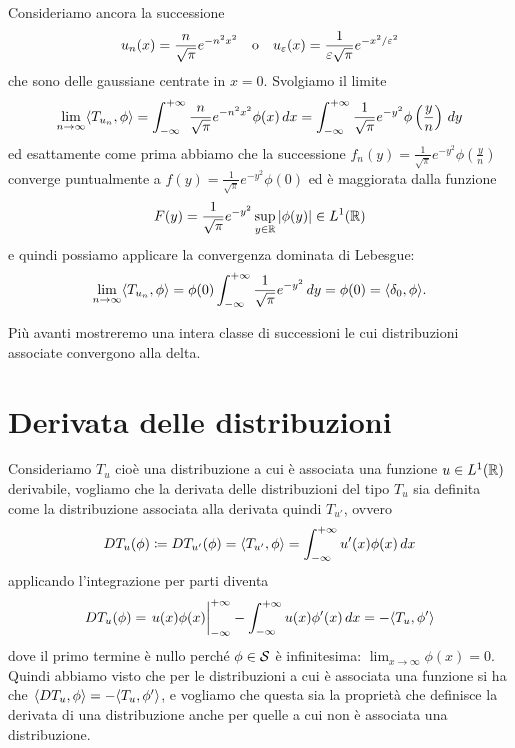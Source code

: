 \begin{example}
  Consideriamo ancora la successione 
  \begin{align}
    u_n(x) = \frac{n}{\sqrt{\pi}} e^{-n^2x^2} \quad \textnormal{o} \quad u_\varepsilon(x) = \frac1{\varepsilon\sqrt{\pi}} e^{-x^2/\varepsilon^2}
  \end{align}
  che sono delle gaussiane centrate in $ x = 0 $. Svolgiamo il limite 
  \begin{align}
    \lim_{n \to \infty} \sc{T_{u_n}, \phi} = \int_{-\infty}^{+\infty} \frac{n}{\sqrt{\pi}} e^{-n^2x^2} \phi(x) \,dx 
    = \int_{-\infty}^{+\infty} \frac1{\sqrt{\pi}} e^{-y^2} \phi\left( \frac{y}{n} \right)\,dy
  \end{align}
  ed esattamente come prima abbiamo che la successione $ f_n(y) = \frac1{\sqrt{\pi}} e^{-y^2} \phi\left( \frac{y}{n} \right) $ converge puntualmente a 
  $ f(y) = \frac1{\sqrt{\pi}} e^{-y^2} \phi(0) $ ed è maggiorata dalla funzione
  \begin{align}
    F(y) = \frac1{\sqrt{\pi}} e^{-y^2} \sup_{y \in \R}\abs{\phi(y)} \in L^1(\R)
  \end{align}
  e quindi possiamo applicare la convergenza dominata di Lebesgue:
  \begin{align}
    \lim_{n \to \infty} \sc{T_{u_n}, \phi} = \phi(0) \int_{-\infty}^{+\infty} \frac1{\sqrt{\pi}} e^{-y^2} \,dy = \phi(0) = \sc{\delta_0, \phi}.
  \end{align}
\end{example}

Più avanti mostreremo una intera classe di successioni le cui distribuzioni associate convergono alla delta.

\section{Derivata delle distribuzioni}
Consideriamo $ T_u $ cioè una distribuzione a cui è associata una funzione $ u \in L^1(\mathbb{R}) $ derivabile, 
vogliamo che la derivata delle distribuzioni del tipo $ T_u $ sia definita come la distribuzione associata alla derivata quindi $ T_{u'} $, 
ovvero 
\begin{align}
  DT_u(\phi) \coloneq DT_{u'}(\phi) = \sc{T_{u'}, \phi} = \int_{-\infty}^{+\infty} u'(x) \phi(x) \,dx
\end{align}
applicando l'integrazione per parti diventa
\begin{align}
  DT_u(\phi) = \left. u(x)\phi(x) \vphantom{\int} \right|_{-\infty}^{+\infty}  - \int_{-\infty}^{+\infty} u(x) \phi'(x) \,dx = - \sc{T_u, \phi'}
\end{align}
dove il primo termine è nullo perché $ \phi \in \S $ è infinitesima: $ \lim_{x \to \infty} \phi(x) = 0 $. 
Quindi abbiamo visto che per le distribuzioni a cui è associata una funzione si ha che $ \sc{DT_u, \phi} = - \sc{T_u, \phi'} $, e vogliamo che questa 
sia la proprietà che definisce la derivata di una distribuzione anche per quelle a cui non è associata una distribuzione. 

